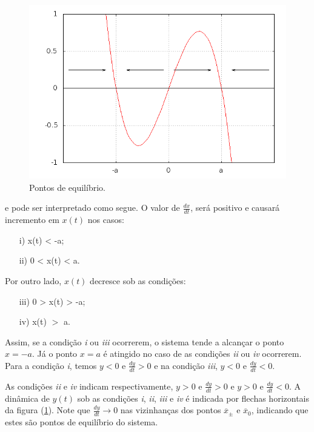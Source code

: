 \begin{figure}[!htb]
\centering
\begin{minipage}[b]{0.55\linewidth}
\includegraphics[width=\linewidth]{./img/secao2_1/camposDirecao.png}
\caption{Pontos de equilíbrio.}
\label{camposDirecao}
\end{minipage} \hfill
\end{figure}
e pode ser interpretado como segue. O valor de $\frac{dx}{dt}$, será positivo e causará incremento em $x(t)$ nos casos:
\begin{itemize}
\item[i)] x(t) < -a;
\item[ii)] 0 < x(t) < a.
\end{itemize}
Por outro lado, $x(t)$ decresce sob as condições:
\begin{itemize}
\item[iii)] 0 > x(t) > -a;
\item[iv)] x(t) $>$ a.
\end{itemize}
Assim, se a condição \textit{i} ou \textit{iii} ocorrerem, o sistema tende a alcançar o ponto $x = -a$. Já o ponto $x = a$ é atingido no caso de as condições \textit{ii} ou \textit{iv} ocorrerem. Para a condição \textit{i}, temos $y < 0 $ e $\frac{dy}{dt} > 0 $ e na condição \textit{iii}, $y < 0$ e $\frac{dy}{dt} < 0$. 

As condições \textit{ii} e \textit{iv} indicam respectivamente, $y > 0$ e $\frac{dy}{dt} > 0$ e $y > 0$ e $\frac{dy}{dt} < 0$. A dinâmica de $y(t)$ sob as condições \textit{i}, \textit{ii}, \textit{iii} e \textit{iv} é indicada por flechas horizontais da figura (\ref{camposDirecao}). Note que $\frac{dy}{dt} \rightarrow 0$ nas vizinhanças dos pontos $\overline{x}_{\pm}$ e $\overline{x}_{0}$, indicando que estes são pontos de equilíbrio do sistema.


